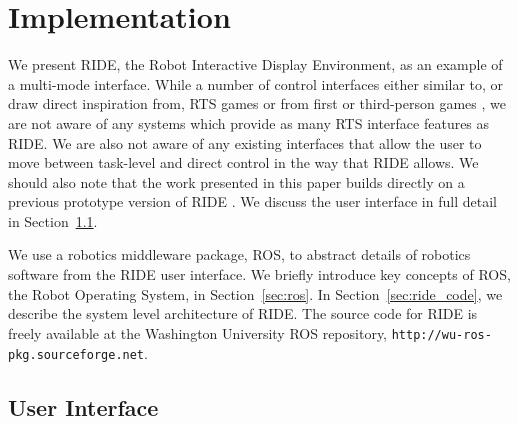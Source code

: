 \chapter{Implementation}

We present RIDE, the Robot Interactive Display Environment, as an example of a multi-mode interface. While a number of control interfaces either similar to, or draw direct inspiration from, RTS games \cite{Bruemmer05turnoff} \cite{Kadous} \cite{Mclurkin} \cite{Tejada} or from first or third-person games \cite{Bruemmer05turnoff} \cite{Humphrey} \cite{Maxwell}, we are not aware of any systems which provide as many RTS interface features as RIDE. We are also not aware of any existing interfaces that allow the user to move between task-level and direct control in the way that RIDE allows. We should also note that the work presented in this paper builds directly on a previous prototype version of RIDE \cite{rrsd08}. We discuss the user interface in full detail in Section~\ref{sec:ride_user_interface}.

We use a robotics middleware package, ROS, to abstract details of robotics software from the RIDE user interface. We briefly introduce key concepts of ROS, the Robot Operating System, in Section~\ref{sec:ros}. In Section~\ref{sec:ride_code}, we describe the system level architecture of RIDE. The source code for RIDE is freely available at the Washington University ROS repository, \verb!http://wu-ros-pkg.sourceforge.net!.





\section{User Interface}
\label{sec:ride_user_interface}

